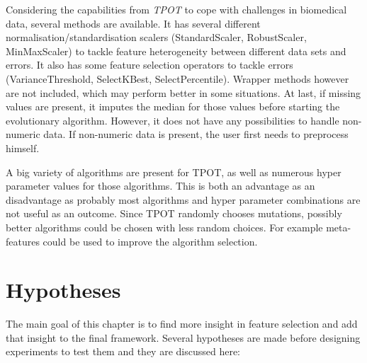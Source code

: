 \documentclass[10pt,a4paper]{report}
\begin{document}
	Considering the capabilities from \textit{TPOT} to cope with challenges in biomedical data, several methods are available. It has several different normalisation/standardisation scalers (StandardScaler, RobustScaler, MinMaxScaler) to tackle feature heterogeneity between different data sets and errors. It also has some feature selection operators to tackle errors (VarianceThreshold, SelectKBest, SelectPercentile). Wrapper methods however are not included, which may perform better in some situations. At last, if missing values are present, it imputes the median for those values before starting the evolutionary algorithm. However, it does not have any possibilities to handle non-numeric data. If non-numeric data is present, the user first needs to preprocess himself.
	
	A big variety of algorithms are present for TPOT, as well as numerous hyper parameter values for those algorithms. This is both an advantage as an disadvantage as probably most algorithms and hyper parameter combinations are not useful as an outcome. Since TPOT randomly chooses mutations, possibly better algorithms could be chosen with less random choices. For example meta-features could be used to improve the algorithm selection.
	
	\newpage
	\section{Hypotheses}
	\label{FSsec:hypotheses}
	
	The main goal of this chapter is to find more insight in feature selection and add that insight to the final framework. Several hypotheses are made before designing experiments to test them and they are discussed here:
	
\end{document}
